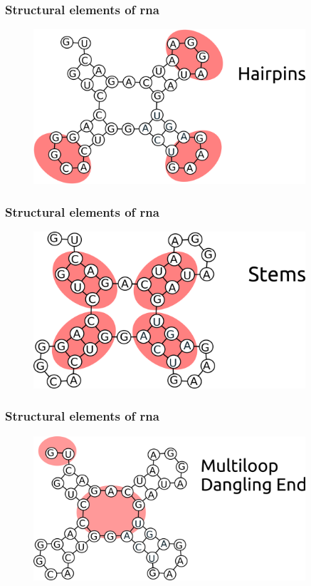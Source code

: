 \documentclass{beamer}
\begin{document}
\begin{frame}
    \frametitle{Structural elements of rna}
   \begin{figure}[h!]
        \centering
        \includegraphics[width=0.9\textwidth]{images/Hairpins.png}
    \end{figure}
\end{frame}
\begin{frame}
    \frametitle{Structural elements of rna}
   \begin{figure}[h!]
        \centering
        \includegraphics[width=0.9\textwidth]{images/stems.png}
    \end{figure}
\end{frame}
\begin{frame}
    \frametitle{Structural elements of rna}
   \begin{figure}[h!]
        \centering
        \includegraphics[width=0.9\textwidth]{images/multiloop.png}
    \end{figure}
\end{frame}
\end{document}
